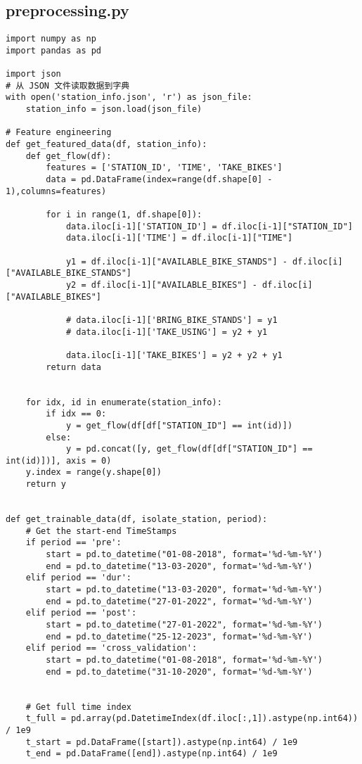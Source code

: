 \subsection{preprocessing.py}\label{Metropolis_Uniform}
\lstset{style=PythonStyle}
\begin{lstlisting}
import numpy as np
import pandas as pd

import json
# 从 JSON 文件读取数据到字典
with open('station_info.json', 'r') as json_file:
    station_info = json.load(json_file)

# Feature engineering
def get_featured_data(df, station_info):
    def get_flow(df):
        features = ['STATION_ID', 'TIME', 'TAKE_BIKES']
        data = pd.DataFrame(index=range(df.shape[0] - 1),columns=features)
    
        for i in range(1, df.shape[0]):
            data.iloc[i-1]['STATION_ID'] = df.iloc[i-1]["STATION_ID"]
            data.iloc[i-1]['TIME'] = df.iloc[i-1]["TIME"]
        
            y1 = df.iloc[i-1]["AVAILABLE_BIKE_STANDS"] - df.iloc[i]["AVAILABLE_BIKE_STANDS"]
            y2 = df.iloc[i-1]["AVAILABLE_BIKES"] - df.iloc[i]["AVAILABLE_BIKES"]
    
            # data.iloc[i-1]['BRING_BIKE_STANDS'] = y1
            # data.iloc[i-1]['TAKE_USING'] = y2 + y1
            
            data.iloc[i-1]['TAKE_BIKES'] = y2 + y2 + y1
        return data

    
    for idx, id in enumerate(station_info):
        if idx == 0:
            y = get_flow(df[df["STATION_ID"] == int(id)])
        else:
            y = pd.concat([y, get_flow(df[df["STATION_ID"] == int(id)])], axis = 0)
    y.index = range(y.shape[0])
    return y


def get_trainable_data(df, isolate_station, period):
    # Get the start-end TimeStamps
    if period == 'pre':
        start = pd.to_datetime("01-08-2018", format='%d-%m-%Y')
        end = pd.to_datetime("13-03-2020", format='%d-%m-%Y')
    elif period == 'dur':
        start = pd.to_datetime("13-03-2020", format='%d-%m-%Y')
        end = pd.to_datetime("27-01-2022", format='%d-%m-%Y')
    elif period == 'post':
        start = pd.to_datetime("27-01-2022", format='%d-%m-%Y')
        end = pd.to_datetime("25-12-2023", format='%d-%m-%Y')
    elif period == 'cross_validation':
        start = pd.to_datetime("01-08-2018", format='%d-%m-%Y')
        end = pd.to_datetime("31-10-2020", format='%d-%m-%Y')

    
    # Get full time index
    t_full = pd.array(pd.DatetimeIndex(df.iloc[:,1]).astype(np.int64)) / 1e9
    t_start = pd.DataFrame([start]).astype(np.int64) / 1e9
    t_end = pd.DataFrame([end]).astype(np.int64) / 1e9
    

\end{lstlisting}
